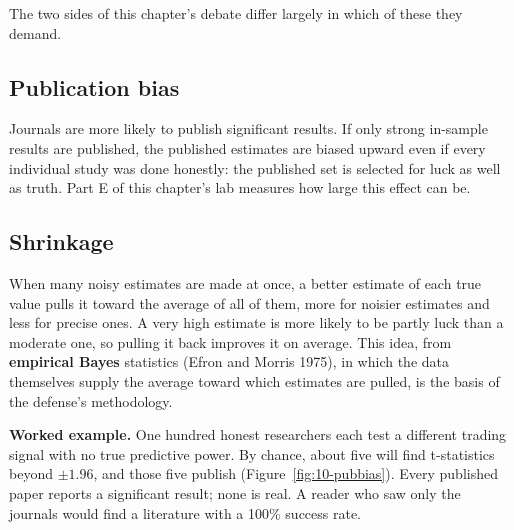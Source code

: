 The two sides of this chapter's debate differ largely in which of these they demand.

\subsection{Publication bias}

Journals are more likely to publish significant results. If only strong in-sample results are published, the published estimates are biased upward even if every individual study was done honestly: the published set is selected for luck as well as truth. Part E of this chapter's lab measures how large this effect can be.

\subsection{Shrinkage}

When many noisy estimates are made at once, a better estimate of each true value pulls it toward the average of all of them, more for noisier estimates and less for precise ones. A very high estimate is more likely to be partly luck than a moderate one, so pulling it back improves it on average. This idea, from \textbf{empirical Bayes} statistics (Efron and Morris 1975), in which the data themselves supply the average toward which estimates are pulled, is the basis of the defense's methodology.

\textbf{Worked example.} One hundred honest researchers each test a different trading signal with no true predictive power. By chance, about five will find t-statistics beyond $\pm 1.96$, and those five publish (Figure~\ref{fig:10-pubbias}). Every published paper reports a significant result; none is real. A reader who saw only the journals would find a literature with a 100\% success rate.

